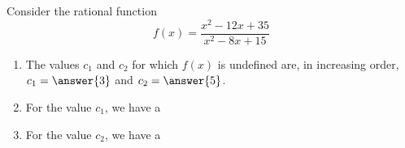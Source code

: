 \documentclass{ximera}
\author{Ivo Terek}
\begin{document}
\begin{exercise}

  Consider the rational function $$    f(x) = \frac{x^2-12x+35}{x^2-8x+15}  $$

  \begin{enumerate}
  \item The values $c_1$ and $c_2$ for which $f(x)$ is undefined are, in increasing order, $c_1 = \answer{3}$ and $c_2 = \answer{5}$.
  \item For the value $c_1$, we have a
    \begin{multipleChoice}
    \end{multipleChoice}
  \item For the value $c_2$, we have a
    \begin{multipleChoice}
    \end{multipleChoice}
  \end{enumerate}

\end{exercise}
\end{document}
